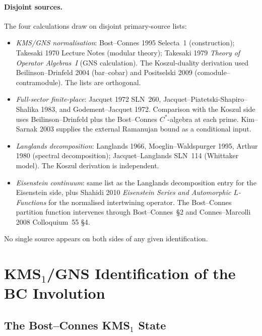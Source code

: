 \paragraph{Disjoint sources.}
The four calculations draw on disjoint primary-source lists:

\begin{itemize}
\item \emph{KMS/GNS normalisation}: Bost--Connes 1995 Selecta~1
(construction); Takesaki 1970 Lecture Notes (modular theory); Takesaki
1979 \emph{Theory of Operator Algebras~I} (GNS calculation). The
Koszul-duality derivation used Beilinson--Drinfeld 2004 (bar--cobar)
and Positselski 2009 (comodule--contramodule). The lists are
orthogonal.

\item \emph{Full-sector finite-place}: Jacquet 1972 SLN~260,
Jacquet--Piatetski-Shapiro--Shalika 1983, and Godement--Jacquet 1972.
Comparison with the Koszul side uses Beilinson--Drinfeld plus the
Bost--Connes \(C^{*}\)-algebra at each prime. Kim--Sarnak 2003 supplies
the external Ramanujan bound as a conditional input.

\item \emph{Langlands decomposition}: Langlands 1966,
Moeglin--Waldspurger 1995, Arthur 1980 (spectral decomposition);
Jacquet--Langlands SLN~114 (Whittaker model). The Koszul derivation
is independent.

\item \emph{Eisenstein continuum}: same list as the Langlands
decomposition entry for the Eisenstein side, plus Shahidi 2010
\emph{Eisenstein Series and Automorphic \(L\)-Functions} for the
normalised intertwining operator. The Bost--Connes partition function
intervenes through Bost--Connes~\S2 and Connes--Marcolli 2008
Colloquium~55 \S4.
\end{itemize}

No single source appears on both sides of any given identification.

\section{KMS\texorpdfstring{\({}_{1}\)}{1}/GNS Identification of the
BC Involution}
\label{v4-arith:kms-gns:cycle1}

\subsection{The Bost--Connes KMS\({}_{1}\) State}
\label{v4-arith:kms-gns:cycle1:state}

